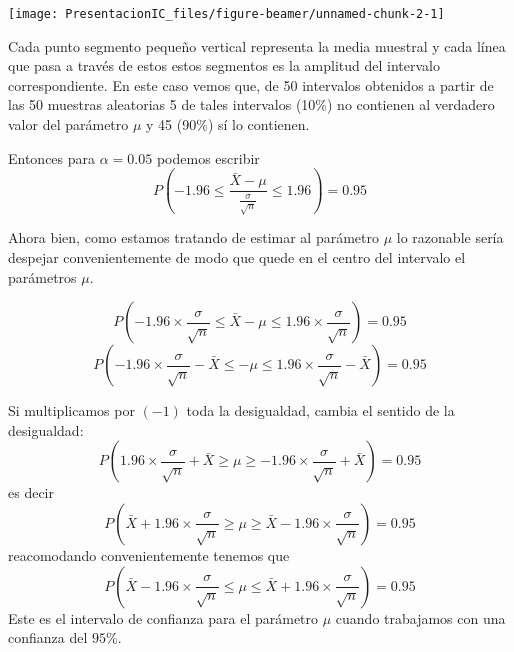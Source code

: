 \documentclass[
  10pt,
  ignorenonframetext,
]{beamer}
\begin{document}
\begin{frame}{}
\protect\hypertarget{section-4}{}
\begin{center}\texttt{[image: PresentacionIC\_files/figure-beamer/unnamed-chunk-2-1]} \end{center}

Cada punto segmento pequeño vertical representa la media muestral y cada
línea que pasa a través de estos estos segmentos es la amplitud del
intervalo correspondiente. En este caso vemos que, de 50 intervalos
obtenidos a partir de las 50 muestras aleatorias 5 de tales intervalos
(10\%) no contienen al verdadero valor del parámetro \(\mu\) y 45 (90\%)
sí lo contienen.
\end{frame}

\begin{frame}{}
\protect\hypertarget{section-5}{}
Entonces para \(\alpha = 0.05\) podemos escribir
\[ P\left(-1.96 \le \frac{\bar{X}-\mu}{\frac{\sigma}{\sqrt{n}}} \le 1.96 \right)=0.95 \]

Ahora bien, como estamos tratando de estimar al parámetro \(\mu\) lo
razonable sería despejar convenientemente de modo que quede en el centro
del intervalo el parámetros \(\mu\).

\[ P\left(-1.96 \times \frac{\sigma}{\sqrt{n}} \le \bar{X}-\mu \le 1.96 \times \frac{\sigma}{\sqrt{n}} \right)=0.95 \]
\[ P\left(-1.96 \times \frac{\sigma}{\sqrt{n}} -\bar{X} \le -\mu \le 1.96 \times \frac{\sigma}{\sqrt{n}} - \bar{X} \right)=0.95 \]
\end{frame}

\begin{frame}{}
\protect\hypertarget{section-6}{}
Si multiplicamos por \((-1)\) toda la desigualdad, cambia el sentido de
la desigualdad:
\[ P\left(1.96 \times \frac{\sigma}{\sqrt{n}} +\bar{X} \ge \mu \ge -1.96 \times \frac{\sigma}{\sqrt{n}} + \bar{X} \right)=0.95 \]
es decir
\[ P\left(\bar{X} +1.96 \times \frac{\sigma}{\sqrt{n}}  \ge \mu \ge \bar{X} -1.96 \times \frac{\sigma}{\sqrt{n}} \right)=0.95 \]
reacomodando convenientemente tenemos que
\[ P\left(\bar{X} - 1.96 \times \frac{\sigma}{\sqrt{n}}  \le \mu \le \bar{X} +1.96 \times \frac{\sigma}{\sqrt{n}} \right)=0.95 \]
Este es el intervalo de confianza para el parámetro \(\mu\) cuando
trabajamos con una confianza del \(95\%\).
\end{frame}
\end{document}
